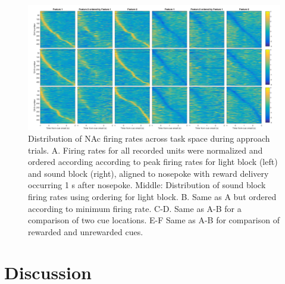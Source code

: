 \documentclass[11pt]{article}
\begin{document}
\begin{figure}[h]
\centering
\includegraphics[width=\textwidth]{Fig 11 - NP task tiling.png}
\caption{Distribution of NAc firing rates across task space during approach trials. A. Firing rates for all recorded units were normalized and ordered according according to peak firing rates for light block (left) and sound block (right), aligned to nosepoke with reward delivery occurring 1 s after nosepoke. Middle: Distribution of sound block firing rates using ordering for light block. B. Same as A but ordered according to minimum firing rate. C-D. Same as A-B for a comparison of two cue locations. E-F Same as A-B for comparison of rewarded and unrewarded cues.}
\label{fig:NP_tiling}
\end{figure}

\section*{Discussion}
\end{document}
